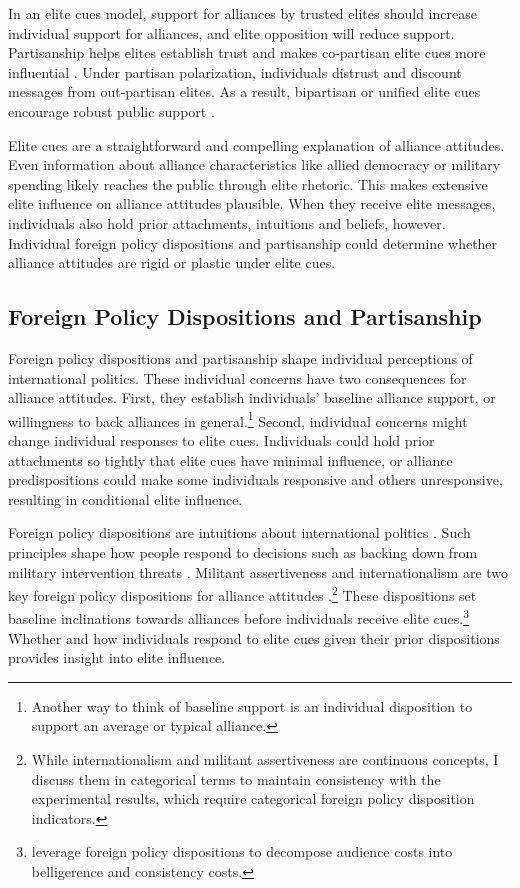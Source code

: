 \documentclass[12pt]{article}
\begin{document}
In an elite cues model, support for alliances by trusted elites should increase individual support for alliances, and elite opposition will reduce support.   
Partisanship helps elites establish trust and makes co-partisan elite cues more influential \citep{Druckmanetal2013}.
Under partisan polarization, individuals distrust and discount messages from out-partisan elites.
As a result, bipartisan or unified elite cues encourage robust public support \citep{Berinsky2007}.


Elite cues are a straightforward and compelling explanation of alliance attitudes.
Even information about alliance characteristics like allied democracy or military spending likely reaches the public through elite rhetoric. 
This makes extensive elite influence on alliance attitudes plausible. 
When they receive elite messages, individuals also hold prior attachments, intuitions and beliefs, however.
Individual foreign policy dispositions and partisanship could determine whether alliance attitudes are rigid or plastic under elite cues. 


\subsection{Foreign Policy Dispositions and Partisanship}


Foreign policy dispositions and partisanship shape individual perceptions of international politics. 
These individual concerns have two consequences for alliance attitudes. 
First, they establish individuals' baseline alliance support, or willingness to back alliances in general.\footnote{Another way to think of baseline support is an individual disposition to support an average or typical alliance.} 
Second, individual concerns might change individual responses to elite cues. 
Individuals could hold prior attachments so tightly that elite cues have minimal influence, or alliance predispositions could make some individuals responsive and others unresponsive, resulting in conditional elite influence.


Foreign policy dispositions are intuitions about international politics \citep{KertzerTingley2018}. 
Such principles shape how people respond to decisions such as backing down from military intervention threats \citep{KertzerBrutger2016}. 
Militant assertiveness and internationalism are two key foreign policy dispositions for alliance attitudes \citep{Herrmannetal1999}.\footnote{While internationalism and militant assertiveness are continuous concepts, I discuss them in categorical terms to maintain consistency with the experimental results, which require categorical foreign policy disposition indicators.}
These dispositions set baseline inclinations towards alliances before individuals receive elite cues.\footnote{\citet{KertzerBrutger2016} leverage foreign policy dispositions to decompose audience costs into belligerence and consistency costs.}
Whether and how individuals respond to elite cues given their prior dispositions provides insight into elite influence. 
\end{document}
